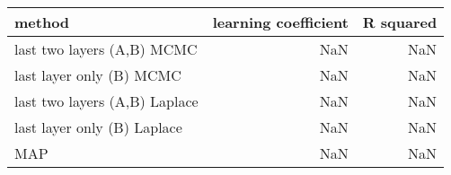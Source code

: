 \begin{tabular}{lrr}
\toprule
                        method &  learning coefficient &  R squared \\
\midrule
    last two layers (A,B) MCMC &                   NaN &        NaN \\
      last layer only (B) MCMC &                   NaN &        NaN \\
 last two layers (A,B) Laplace &                   NaN &        NaN \\
   last layer only (B) Laplace &                   NaN &        NaN \\
                           MAP &                   NaN &        NaN \\
\bottomrule
\end{tabular}
